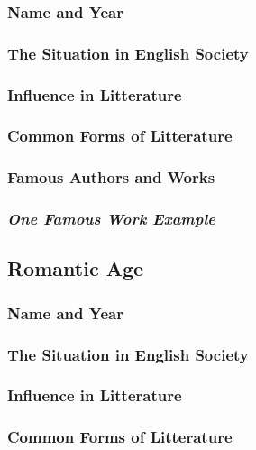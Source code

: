 \subsubsection{Name and Year}

\subsubsection{The Situation in English Society}

\subsubsection{Influence in Litterature}

\subsubsection{Common Forms of Litterature}

\subsubsection{Famous Authors and Works}

\subsubsection{\textit{One Famous Work Example}}

\newpage
\subsection{Romantic Age}

\subsubsection{Name and Year}

\subsubsection{The Situation in English Society}

\subsubsection{Influence in Litterature}

\subsubsection{Common Forms of Litterature}

